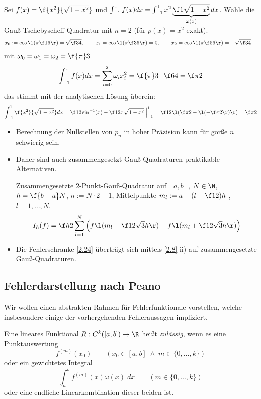 \documentclass[11pt]{scrartcl}
\begin{document}
\begin{ex*}
	Sei $f(x) = \f {x^2}{\sqrt{1-x^2}}$ und $\int_{-1}^1 f(x) dx = \int_{-1}^1 x^2 \underbrace{\f 1{\sqrt{1-x^2}}}_{\omega(x)} dx$.
	Wähle die Gauß-Tschebyscheff-Quadratur mit $n=2$ (für $p(x) = x^2$ exakt).
	\begin{align*}
		x_0 := \cos\l(\pi \f 16 \r) = \sqrt{\f 34}, \qquad x_1 &= \cos\l(\pi \f 36\r) = 0, \qquad x_2 = \cos \l(\pi\f 56\r) = -\sqrt{\f 34}
	\end{align*}
	mit $\omega_0 = \omega_1 = \omega_2 = \f {\pi}3$
	\[
		\int_{-1}^1 f(x) dx = \sum_{i=0}^2 \omega_i x_i^2 = \f {\pi}3 \cdot \f 64 = \f \pi2
	\]
	das stimmt mit der analytischen Lösung überein:
	\[
		\int_{-1}^1 \f {x^2}{\sqrt{1-x^2}} dx = \f 12 \sin^{-1}(x) - \f 12 x\sqrt{1-x^2} \; \Big|_{-1}^1 = \f 12 \l( \f \pi 2 - \l(-\f \pi 2\r) \r) = \f \pi2
	\]
\end{ex*}

\begin{nt*}
	\begin{itemize}
		\item
			Berechnung der Nullstellen von $p_n$ in hoher Präzision kann für gorße $n$ schwierig sein.
		\item
			Daher sind auch zusammengesetzt Gauß-Quadraturen praktikable Alternativen.
			\begin{ex*}
				Zusammengesetzte 2-Punkt-Gauß-Quadratur auf $[a,b]$, $N\in \N$, $h=\f {b-a}N$, $n:= N\cdot 2 - 1$, Mittelpunkte $m_l := a+ (l-\f 12)h$ , $l= 1,\dotsc, N$.
				\[
					I_h (f) = \f h2 \sum_{l=1}^N \Big( f\l(m_l- \f 1{2\sqrt 3} h\r) + f\l( m_l + \f 1{2\sqrt 3} h\r) \Big)
				\]
			\end{ex*}
		\item
			Die Fehlerschranke \ref{2.24} überträgt sich mittels \ref{2.8} ii) auf zusammengesetzte Gauß-Quadraturen.
	\end{itemize}
\end{nt*}


\subsection{Fehlerdarstellung nach Peano}

Wir wollen einen abstrakten Rahmen für Fehlerfunktionale vorstellen, welche insbesondere einige der vorhergehenden Fehleraussagen impliziert.

\begin{df}
	\label{2.27}
	Eine lineares Funktional $R : C^k([a,b]) \to \R$ heißt \emph{zulässig}, wenn es eine Punktauswertung 
	\[
		f^{(m)}(x_0)
		\qquad (x_0\in [a,b] \;\land\; m\in \{0,\dotsc,k\})
	\]
	oder ein gewichtetes Integral
	\[
		\int_a^b f^{(m)}(x) \omega(x) \; dx
		\qquad (m \in \{0,\dotsc,k\})
	\]
	oder eine endliche Linearkombination dieser beiden ist.
\end{df}
\end{document}
